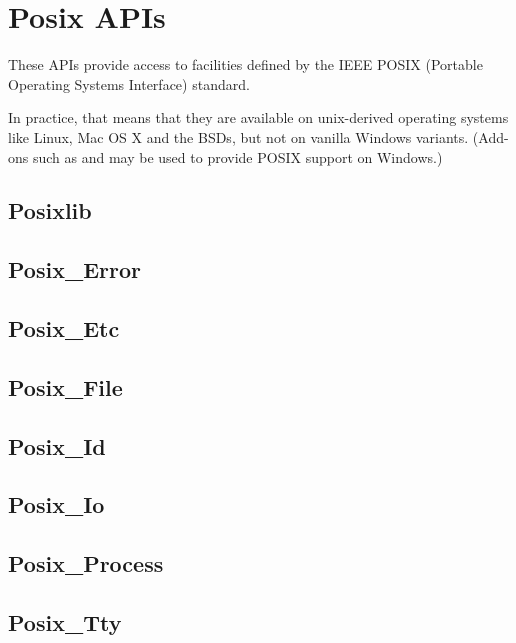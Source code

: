 \section{Posix APIs}

%
%

These APIs provide access to facilities defined by the IEEE POSIX 
(Portable Operating Systems Interface) standard.

In practice, that means that they are available on unix-derived 
operating systems like Linux, Mac OS X and the BSDs, but not on 
vanilla Windows variants.  (Add-ons such as 
  
and 
  
may be used to provide POSIX support on Windows.)


\subsection{Posixlib}					
\subsection{Posix\_Error}				
\subsection{Posix\_Etc}					
\subsection{Posix\_File}				
\subsection{Posix\_Id}					
\subsection{Posix\_Io}					
\subsection{Posix\_Process}				
\subsection{Posix\_Tty}					

